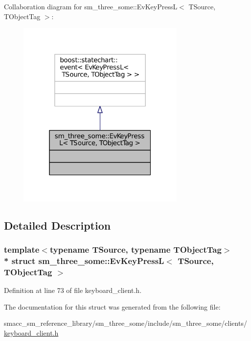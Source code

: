 Collaboration diagram for sm\+\_\+three\+\_\+some\+:\+:Ev\+Key\+PressL$<$ T\+Source, T\+Object\+Tag $>$\+:
\nopagebreak
\begin{figure}[H]
\begin{center}
\leavevmode
\includegraphics[width=235pt]{structsm__three__some_1_1EvKeyPressL__coll__graph}
\end{center}
\end{figure}


\subsection{Detailed Description}
\subsubsection*{template$<$typename T\+Source, typename T\+Object\+Tag$>$\\*
struct sm\+\_\+three\+\_\+some\+::\+Ev\+Key\+Press\+L$<$ T\+Source, T\+Object\+Tag $>$}



Definition at line 73 of file keyboard\+\_\+client.\+h.



The documentation for this struct was generated from the following file\+:\begin{DoxyCompactItemize}
\item 
smacc\+\_\+sm\+\_\+reference\+\_\+library/sm\+\_\+three\+\_\+some/include/sm\+\_\+three\+\_\+some/clients/\hyperlink{keyboard__client_8h}{keyboard\+\_\+client.\+h}\end{DoxyCompactItemize}
